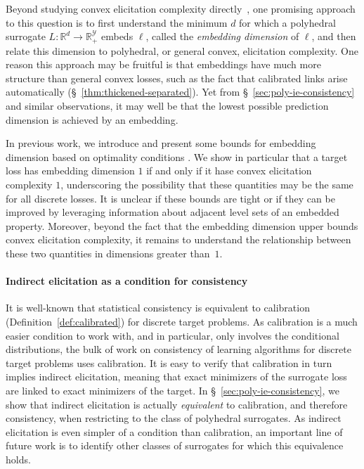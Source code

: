 \documentclass[twoside,11pt]{article}
\newcommand{\reals}{\mathbb{R}}
\newcommand{\Y}{\mathcal{Y}}
\begin{document}
Beyond studying convex elicitation complexity directly~\citep{ramaswamy2016convex,finocchiaro2021unifying,frongillo2021elicitation},
one promising approach to this question is to first understand the minimum $d$ for which a polyhedral surrogate $L:\reals^d\to \reals^\Y_+$ embeds $\ell$, called the \emph{embedding dimension} of $\ell$, and then relate this dimension to polyhedral, or general convex, elicitation complexity.
One reason this approach may be fruitful is that embeddings have much more structure than general convex losses, such as the fact that calibrated links arise automatically (\S~\ref{thm:thickened-separated}).
Yet from \S~\ref{sec:poly-ie-consistency} and similar observations, it may well be that the lowest possible prediction dimension is achieved by an embedding.

In previous work, we introduce and present some bounds for embedding dimension
based on optimality conditions \citep{finocchiaro2020embedding}.
We show in particular that a target loss has embedding dimension $1$ if and only if it hase convex elicitation complexity $1$, underscoring the possibility that these quantities may be the same for all discrete losses.
It is unclear if these bounds are tight or if they can be improved by leveraging information about adjacent level sets of an embedded property.
Moreover, beyond the fact that the embedding dimension upper bounds convex elicitation complexity, it remains to understand the relationship between these two quantities in dimensions greater than~$1$.


\paragraph{Indirect elicitation as a condition for consistency}

It is well-known that statistical consistency is equivalent to calibration (Definition~\ref{def:calibrated}) for discrete target problems.
As calibration is a much easier condition to work with, and in particular, only involves the conditional distributions, the bulk of work on consistency of learning algorithms for discrete target problems uses calibration.
It is easy to verify that calibration in turn implies indirect elicitation, meaning that exact minimizers of the surrogate loss are linked to exact minimizers of the target.
In \S~\ref{sec:poly-ie-consistency}, we show that indirect elicitation is actually \emph{equivalent} to calibration, and therefore consistency, when restricting to the class of polyhedral surrogates.
As indirect elicitation is even simpler of a condition than calibration, an important line of future work is to identify other classes of surrogates for which this equivalence holds.
\end{document}
